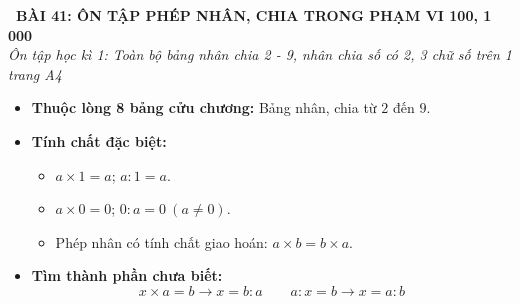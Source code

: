 \documentclass[11pt,a4paper]{article}
\begin{document}
\begin{tcolorbox}[
  enhanced,
  colback=white,
  colframe=primary,
  arc=3mm,
  boxrule=1.2pt,
  left=4mm, right=4mm, top=2.5mm, bottom=2.5mm,
  drop shadow=black!10!white
]
  \centering
  {\Large\bfseries\color{primary}\faBookmark\ BÀI 41: ÔN TẬP PHÉP NHÂN, CHIA TRONG PHẠM VI 100, 1 000}\\[1.5mm]
  {\small\itshape\color{black!75}Ôn tập học kì 1: Toàn bộ bảng nhân chia 2 - 9, nhân chia số có 2, 3 chữ số trên 1 trang A4}
\end{tcolorbox}

\vspace{-2mm}


\noindent
\begin{minipage}[t]{0.49\textwidth}\vspace{0pt}
\begin{tcolorbox}[
  enhanced,
  colback=blue!4!white,
  colframe=blue!75!black,
  arc=2mm, boxrule=0.8pt,
  left=2mm, right=2mm, top=1.8mm, bottom=1.8mm,
  title={\footnotesize\bfseries\color{white}\faKey\ 1. Bảng nhân chia và tính chất}
]
{\footnotesize
\begin{itemize}\setlength{\itemsep}{1.5pt}\setlength{\leftskip}{-2.5mm}
  \item \textbf{Thuộc lòng 8 bảng cửu chương:} Bảng nhân, chia từ $2$ đến $9$.
  \item \textbf{Tính chất đặc biệt:}
  \begin{itemize}\setlength{\itemsep}{0.5pt}\setlength{\leftskip}{-2.5mm}
    \item $a \times 1 = a$; $a : 1 = a$.
    \item $a \times 0 = 0$; $0 : a = 0\ (a \ne 0)$.
    \item Phép nhân có tính chất giao hoán: $a \times b = b \times a$.
  \end{itemize}
  \item \textbf{Tìm thành phần chưa biết:}
  $$x \times a = b \to x = b : a \qquad a : x = b \to x = a : b$$
\end{itemize}
}
\end{tcolorbox}
\end{minipage}
\hfill
\end{document}
